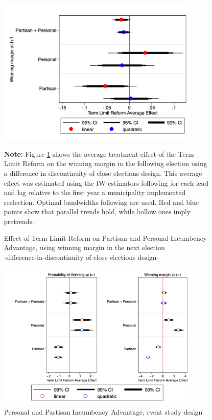 \documentclass[12pt]{amsart}
\numberwithin{equation}{section}
\theoremstyle{definition}
\theoremstyle{definition}
\theoremstyle{definition}
\begin{document}
\begin{appendix}
\begin{figure}[h]   
\centering    
 \caption{Effect of Term Limit Reform on Partisan and Personal Incumbency Advantage, using winning margin in the next election \\ -difference-in-discontinuity of close elections design-}
 \label{fig:personal_vs_partisan_margin}
\includegraphics[width=0.9\textwidth]{Figures_incumbency/partisan_personal_inc_advantage_margin.png}
       \captionsetup{justification=centering}
         
 \textbf{Note:} Figure \ref{fig:personal_vs_partisan_margin} shows the average treatment effect of the Term Limit Reform on the winning margin in the following election using a difference in discontinuity of close elections design. This average effect was estimated using the IW estimators following \citet{abraham_sun_2020} for each lead and lag relative to the first year a municipality implemented reelection. Optimal bandwidths following \citet{calonicoetal_2014} are used. Red and blue points show that parallel trends hold, while hollow ones imply pretrends. 
\end{figure}           

 \begin{figure}[h]   
\centering
 \caption{Personal and Partisan Incumbency Advantage, event study design}
 \label{fig:naive_partisan&personal}
 \includegraphics[width=0.9\textwidth]{Figures_incumbency/naive_personalvspartisan_advantage.png}
 

\end{figure}
\end{appendix}
\end{document}
